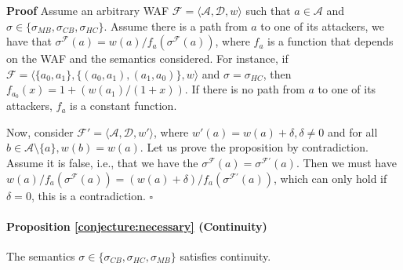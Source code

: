\documentclass{article}
\newcommand{\AF}{\mathcal{F}}
\newcommand{\A}{\mathcal{A}}
\newcommand{\D}{\mathcal{D}}
\newenvironment{proof}{\textbf{Proof}}{\hfill$\square$}
\begin{document}
\medskip

\begin{proof}
Assume an arbitrary WAF $\AF = \langle \A, \D,w \rangle$ such that $a \in \A$ and $\sigma \in \{\sigma_{MB},\sigma_{CB},\sigma_{HC}\}$.
Assume there is a path from $a$ to one of its attackers, we have that $\sigma^\AF(a)=w(a) / f_a(\sigma^\AF(a))$, where $f_a$ is a function that depends on the WAF and the semantics considered. 
%
For instance, if $\AF = \langle \{a_0, a_1\}, \{ (a_0, a_1), (a_1, a_0)\}, w \rangle$ and $\sigma = \sigma_{HC}$, then $f_{a_0}(x) = 1 + (w(a_1)/(1+x))$.
%
If there is no path from $a$ to one of its attackers, $f_a$ is a constant function.

Now, consider $\AF'=\langle \A, \D,w'\rangle$, where $ w'(a) = w(a) + \delta, \delta \neq 0$ and for all $ b \in \A \setminus \{a\}, w(b)=w(a)$.
Let us prove the proposition by contradiction. Assume it is false, i.e., that we have the $\sigma^\AF(a) = \sigma^{\AF'}(a)$. Then we must have $w(a) / f_a(\sigma^\AF(a))=(w(a)+\delta) / f_a(\sigma^{\AF'}(a))$, which can only hold if  $\delta=0$, this is a contradiction.
\end{proof}



\paragraph{Proposition \ref{conjecture:necessary} (Continuity)} The semantics $\sigma \in \{ \sigma_{CB}, \sigma_{HC}, \sigma_{MB}\}$ satisfies continuity.


\medskip
\end{document}
